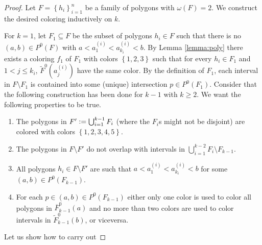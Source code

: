 \documentclass[12pt]{article}
\theoremstyle{definition}
\newcommand{\defeq}{\vcentcolon=}
\begin{document}
     \begin{proof}
         Let $F = \left\{h_{i}\right\}_{i = 1}^{n}$
         be a family of polygons with
         $\omega\left(F\right) = 2$.
         We construct the desired
         coloring inductively on $k$.

         For $k = 1$, let $F_1 \subseteq F$
         be the subset of polygons
         $h_{i} \in F$ such that 
         there is no $\left(a, b\right)
         \in P^{0}\left(F\right)$
         with $a < a_1^{\left(i\right)} <
         a_{k_{i}}^{\left(i\right)} < b$.
         By Lemma \ref{lemma:poly} there
         exists a coloring $f_1$ of $F_1$
         with colors $\left\{1, 2, 3\right\}$ 
         such that for every $h_{i} \in F_1$ 
         and $1 < j \leq k_{i}$,
         $\widetilde{F}^{0}\left(a_{j}^{\left(i\right)}\right)$ 
         have the same color.
         By the definition of $F_1$,
         each interval in $F \setminus F_1$ 
         is contained into some (unique)
         intersection $p \in P^{0}\left(F_1\right)$.
         Consider that the following construction 
         has been done for $k - 1$
         with $k \geq 2$. We want the 
         following properties to be true.
         \begin{enumerate}
             \item The polygons in $F' \defeq 
             \bigcup_{i =1}^{k-1} F_{i}$ 
             (where the $F_{i}$s might not
             be disjoint) are colored with colors
             $\left\{1, 2, 3, 4, 5\right\}$.
             \item The polygons in $F \setminus F'$ 
             do not overlap with
             intervals in
             $\bigcup_{i =1}^{k-2} F_{i} \setminus F_{k-1}$.
             \item All polygons
             $h_{i} \in F \setminus F'$ 
             are such that
             $a < a_1^{\left(i\right)}
             < a_{k_{i}}^{\left(i\right)} < b$
             for some
             $\left(a, b\right) \in P^{0}\left(F_{k-1}\right)$.
             \item For each
             $p \in \left(a, b\right)
             \in P^{0}\left(F_{k-1}\right)$ 
             either only one color is 
             used to color all polygons in
             $\overline{F}_{k-1}^{0}\left(a\right)$ 
             and no more than two colors are used
             to color intervals in
             $\widetilde{F}_{k-1}^{0}\left(b\right)$,
             or viceversa.
         \end{enumerate}
         Let us show how to carry out

\end{proof}
\end{document}
